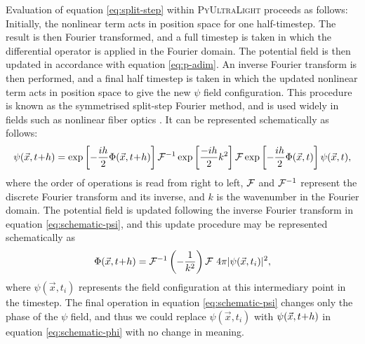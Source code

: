 \documentclass[a4paper,11pt]{article}
\newcommand{\PyUltraLight}{\textsc{PyUltraLight}\xspace}
\begin{document}
Evaluation of equation \ref{eq:split-step} within \PyUltraLight proceeds as follows:
Initially, the nonlinear term acts in position space for one half-timestep. The result is then Fourier transformed, and a full timestep is taken in which the differential operator is applied in the Fourier domain. The potential field is then updated in accordance with equation \ref{eq:p-adim}. An inverse Fourier transform is then performed, and a final half timestep is taken in which the updated nonlinear term acts in position space to give the new $\psi$ field configuration. This procedure is known as the symmetrised split-step Fourier method, and is used widely in fields such as nonlinear fiber optics \cite{Agrawal2013}. It can be represented schematically as follows:
\begin{equation}\label{eq:schematic-psi}
    \psi(\vec{x},t\hspace*{-.2em}+\hspace*{-.2em}h)=\operatorname{exp}\left[-\frac{ih}{2}\Phi(\vec{x},t\hspace*{-.2em}+\hspace*{-.2em}h)\right]\CMcal{F}^{-1} \operatorname{exp}\left[\frac{-ih}{2}k^2\right]\CMcal{F}\operatorname{exp}\left[-\frac{ih}{2}\Phi(\vec{x},t)\right]\psi(\vec{x},t),
\end{equation}
where the order of operations is read from right to left, $\CMcal{F}$ and $\CMcal{F}^{-1}$ represent the discrete Fourier transform and its inverse, and $k$ is the wavenumber in the Fourier domain. The potential field is updated following the inverse Fourier transform in equation \ref{eq:schematic-psi}, and this update procedure may be represented schematically as
\begin{equation}\label{eq:schematic-phi}
    \Phi(\vec{x},t\hspace*{-.2em}+\hspace*{-.2em}h)=\CMcal{F}^{-1}\left(-\frac{1}{k^2}\right)\CMcal{F}\ 4\pi\vert\psi(\vec{x},t_{i})\vert^2,
\end{equation}
where $\psi(\vec{x},t_{i})$ represents the field configuration at this intermediary point in the timestep. The final operation in equation \ref{eq:schematic-psi} changes only the phase of the $\psi$ field, and thus we could replace $\psi(\vec{x},t_{i})$ with $\psi(\vec{x},t\hspace*{-.2em}+\hspace*{-.2em}h)$ in equation \ref{eq:schematic-phi} with no change in meaning. 
\end{document}

